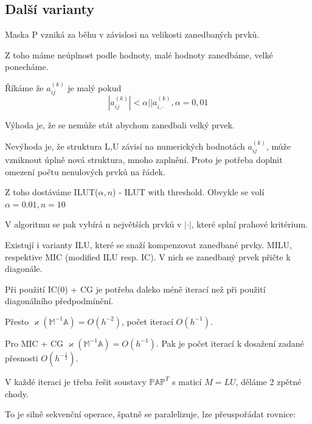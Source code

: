 \documentclass[../main.tex]{subfiles}
\begin{document}
\subsection{Další varianty}

Maska P vzniká za běhu v závislosi na velikosti zanedbaných prvků.

Z toho máme neúplnost podle hodnoty, malé hodnoty zanedbáme, velké ponecháme.

Říkáme že $a_{ij}^{(k)}$ je malý pokud \begin{equation*}
    |a_{ij}^(k)| < \alpha ||a_{i,\cdot}^{(k)}, \alpha = 0,01
\end{equation*}

Výhoda je, že se nemůže stát abychom zanedbali velký prvek. 

Nevýhoda je, že struktura L,U závisí na numerických hodnotách $a_{ij}^{(k)}$, může vzniknout úplně nová struktura, mnoho zaplnění.
Proto je potřeba doplnit omezení počtu nenulových prvků na řádek.

Z toho dostáváme ILUT($\alpha, n$) - ILUT with threshold. Obvykle se volí $\alpha = 0.01, n=10$

V algoritmu se pak vybírá n největších prvků  v $|\cdot|$, které splní prahové kritérium.


\begin{remark}
    Existují i varianty ILU, které se snaží kompenzovat zanedbané prvky. MILU, respektive MIC (modified ILU resp. IC).
    V nich se zanedbaný prvek přičte k diagonále.
\end{remark}

\begin{remark}
    Při použití IC(0) + CG je potřeba daleko méně iterací než při použití diagonálního předpodmínění.

    Přesto $\varkappa(\mathbb{M}^{-1} \mathbb{A}) = O(h^{-2})$, počet iterací $O(h^{-1})$.

    Pro MIC + CG $\varkappa(\mathbb{M}^{-1} \mathbb{A}) = O(h^{-1})$. Pak je počet iterací k dosažení zadané přesnosti  $O(h^{-\frac{1}{2}})$.
\end{remark}

\begin{remark}
    V každé iteraci je třeba řešit soustavy $\mathbb{P} \mathbb{A} \mathbb{P}^T$ s maticí $M = LU$, děláme 2 zpětné chody.

    To je silně sekvenční operace, špatně se paralelizuje, lze přeuspořádat rovnice:

    

\end{remark}
\end{document}
